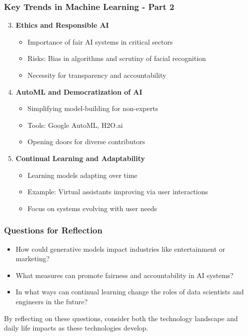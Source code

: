 \documentclass[aspectratio=169]{beamer}
\begin{document}
\begin{frame}[fragile]
    \frametitle{Key Trends in Machine Learning - Part 2}
    \begin{enumerate}
        \setcounter{enumi}{2} %
        \item \textbf{Ethics and Responsible AI}
        \begin{itemize}
            \item Importance of fair AI systems in critical sectors
            \item Risks: Bias in algorithms and scrutiny of facial recognition
            \item Necessity for transparency and accountability
        \end{itemize}
        
        \item \textbf{AutoML and Democratization of AI}
        \begin{itemize}
            \item Simplifying model-building for non-experts
            \item Tools: Google AutoML, H2O.ai
            \item Opening doors for diverse contributors
        \end{itemize}
        
        \item \textbf{Continual Learning and Adaptability}
        \begin{itemize}
            \item Learning models adapting over time
            \item Example: Virtual assistants improving via user interactions
            \item Focus on systems evolving with user needs
        \end{itemize}
    \end{enumerate}
\end{frame}

\begin{frame}[fragile]
    \frametitle{Questions for Reflection}
    \begin{itemize}
        \item How could generative models impact industries like entertainment or marketing?
        \item What measures can promote fairness and accountability in AI systems?
        \item In what ways can continual learning change the roles of data scientists and engineers in the future?
    \end{itemize}
    By reflecting on these questions, consider both the technology landscape and daily life impacts as these technologies develop.
\end{frame}
\end{document}
